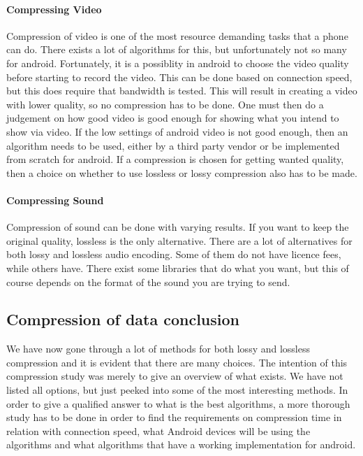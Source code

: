 \newpage

\paragraph{Compressing Video} \hfill
\newline
Compression of video is one of the most resource demanding tasks that a phone can do. There exists a lot of algorithms for this, but unfortunately not so many for android. Fortunately, it is a possiblity in android to choose the video quality before starting to record the video. This can be done based on connection speed, but this does require that bandwidth is tested. This will result in creating a video with lower quality, so no compression has to be done. One must then do a judgement on how good video is good enough for showing what you intend to show via video. If the low settings of android video is not good enough, then an algorithm needs to be used, either by a third party vendor or be implemented from scratch for android. If a compression is chosen for getting wanted quality, then a choice on whether to use lossless or lossy compression also has to be made.

\paragraph{Compressing Sound}\hfill
\newline
Compression of sound can be done with varying results. If you want to keep the original quality, lossless is the only alternative. There are a lot of alternatives for both lossy and lossless audio encoding. Some of them do not have licence fees, while others have. There exist some libraries that do what you want, but this of course depends on the format of the sound you are trying to send.

\subsection{Compression of data conclusion}
We have now gone through a lot of methods for both lossy and lossless compression and it is evident that there are many choices. The intention of this compression study was merely to give an overview of what exists. We have not listed all options, but just peeked into some of the most interesting methods. In order to give a qualified answer to what is the best algorithms, a more thorough study has to be done in order to find the requirements on compression time in relation with connection speed, what Android devices will be using the algorithms and what algorithms that have a working implementation for android.  







